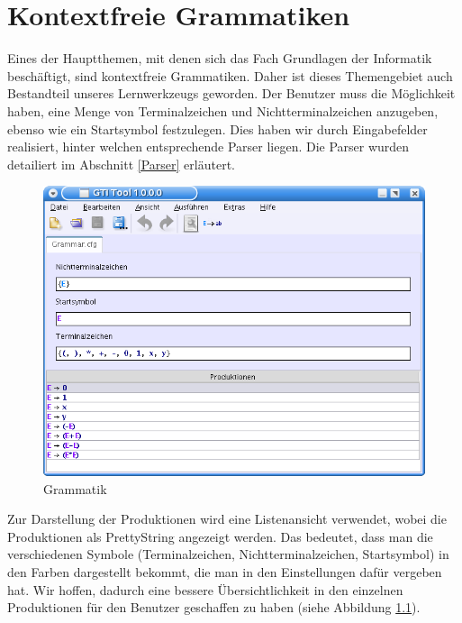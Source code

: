



\chapter{Kontextfreie Grammatiken}\label{Grammars}

Eines der Hauptthemen, mit denen sich das Fach Grundlagen der Informatik
beschäftigt, sind kontextfreie Grammatiken. Daher ist dieses Themengebiet auch
Bestandteil unseres Lernwerkzeugs geworden. Der Benutzer muss die Möglichkeit
haben, eine Menge von Terminalzeichen und Nichtterminalzeichen anzugeben, ebenso
wie ein Startsymbol festzulegen. Dies haben wir durch Eingabefelder realisiert,
hinter welchen entsprechende Parser liegen. Die Parser wurden detailiert im
Abschnitt
\ref{Parser} erläutert.\vspace{10pt}

\begin{figure}[h!]
\begin{center}
\includegraphics[width=12cm]{../images/cfg_example.png}
\caption{Grammatik}
\label{FigureProduction}
\end{center}
\end{figure}
\vspace{10pt}

Zur Darstellung der Produktionen wird eine Listenansicht verwendet, wobei die
Produktionen als PrettyString angezeigt werden. Das bedeutet, dass man die
verschiedenen Symbole (Terminalzeichen, Nichtterminalzeichen, Startsymbol) in den
Farben dargestellt bekommt, die man in den Einstellungen dafür vergeben hat. Wir
hoffen, dadurch eine bessere Übersichtlichkeit in den einzelnen Produktionen für
den Benutzer geschaffen zu haben (siehe Abbildung
\ref{FigureProduction}).\vspace{10pt}


